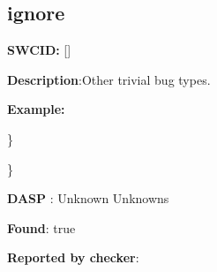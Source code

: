 \documentclass{article}
\begin{document}
\subsection{ignore} 
\textbf{SWC{\textunderscore }ID:} []

\textbf{Description}:Other trivial bug types.


\textbf{Example:} 
\begin{ffcode} 


\end{ffcode} 
\} 

\} 

\textbf{DASP} : Unknown Unknowns

\textbf{Found}: true

\textbf{Reported by checker}: 
\begin{ffcode} 


\end{ffcode}
\end{document}
